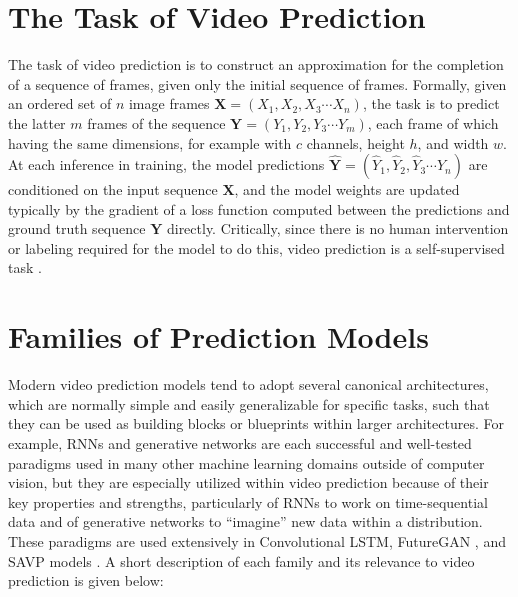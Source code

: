 \documentclass{scrartcl}
\begin{document}
\section{The Task of Video Prediction}
\label{sec:task}

\newcommand{\Xseq}{$\boldsymbol{X} = \left( X_1 , X_2 , X_3 \cdots X_n \right)$}
\newcommand{\Yseq}{$\boldsymbol{Y} = \left( Y_1 , Y_2 , Y_3 \cdots Y_m \right)$}
\newcommand{\Yhatseq}{
	$\hat{\boldsymbol{Y}} = 
	\left( \hat{Y}_1 , \hat{Y}_2 , \hat{Y}_3 \cdots \hat{Y}_n \right)$
}

The task of video prediction is to construct an approximation for the
completion of a sequence of frames, given only the initial sequence of frames.
Formally, given an ordered set of $n$ image frames \Xseq, the task is to
predict the latter $m$ frames of the sequence \Yseq, each frame of which having
the same dimensions, for example with $c$ channels, height $h$, and width $w$.
At each inference in training, the model predictions \Yhatseq are conditioned
on the input sequence $\boldsymbol{X}$, and the model weights are updated
typically by the gradient of a loss function computed between the predictions
and ground truth sequence $\boldsymbol{Y}$ directly. Critically, since there is
no human intervention or labeling required for the model to do this, video
prediction is a self-supervised task \cite{video_prediction_survey}.

\newpage
\section{Families of Prediction Models}
\label{sec:families}

Modern video prediction models tend to adopt several canonical architectures,
which are normally simple and easily generalizable for specific tasks, such that
they can be used as building blocks or blueprints within larger architectures.
For example, RNNs and generative networks are each successful and well-tested
paradigms used in many other machine learning domains outside of computer
vision, but they are especially utilized within video prediction because of
their key properties and strengths, particularly of RNNs to work on
time-sequential data and of generative networks to ``imagine'' new data
within a distribution. These paradigms are used extensively in Convolutional
LSTM, FutureGAN \cite{futuregan}, and SAVP models \cite{savp}. A short
description of each family and its relevance to video prediction is given
below:
\end{document}
